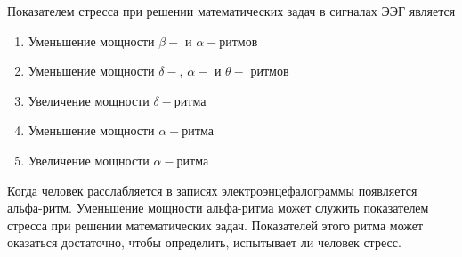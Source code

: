 
Показателем стресса при решении математических задач в сигналах ЭЭГ является

\begin{enumerate}
    \item Уменьшение мощности $\beta-$ и $\alpha-$ритмов
    \item Уменьшение мощности $\delta-$, $\alpha-$ и $\theta-$ ритмов
    \item Увеличение мощности $\delta-$ритма
    \item Уменьшение мощности $\alpha-$ритма
    \item Увеличение мощности $\alpha-$ритма
\end{enumerate}

\explanationSection

Когда человек расслабляется в записях электроэнцефалограммы появляется альфа-ритм. Уменьшение мощности альфа-ритма может служить показателем стресса при решении математических задач. Показателей этого ритма может оказаться достаточно, чтобы определить, испытывает ли человек стресс.

